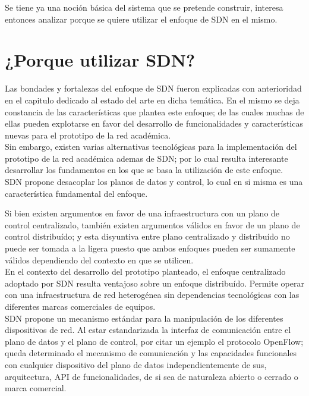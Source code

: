Se tiene ya una noción básica del sistema que se pretende construir, interesa entonces analizar porque se quiere utilizar el enfoque de SDN en el mismo.
  
\section[¿Porque utilizar SDN?]{¿Porque utilizar SDN?}

Las bondades y fortalezas del enfoque de SDN fueron explicadas con anterioridad en el capitulo dedicado al estado del arte en dicha tem\'atica. En el mismo se deja constancia de las caracter\'isticas que plantea este enfoque; de las cuales muchas de ellas pueden explotarse en favor del desarrollo de funcionalidades y caracter\'isticas nuevas para el prototipo de la red acad\'emica.\\

Sin embargo, existen varias alternativas tecnol\'ogicas para la implementaci\'on del prototipo de la red acad\'emica ademas de SDN; por lo cual resulta interesante desarrollar los fundamentos en los que se basa la utilizaci\'on de este enfoque.\\  

SDN propone desacoplar los planos de datos y control, lo cual en si misma es una caracter\'istica fundamental del enfoque.

Si bien existen argumentos en favor de una infraestructura con un plano de control centralizado, tambi\'en existen argumentos v\'alidos en favor de un plano de control distribu\'ido; y esta disyuntiva entre plano centralizado y distribu\'ido no puede ser tomada a la ligera puesto que ambos enfoques pueden ser sumamente v\'alidos dependiendo del contexto en que se utilicen.\\

En el contexto del desarrollo del prototipo planteado, el enfoque centralizado adoptado por SDN resulta ventajoso sobre un enfoque distribu\'ido. Permite operar con una infraestructura de red heterog\'enea sin dependencias tecnol\'ogicas con las diferentes marcas comerciales de equipos.\\

SDN propone un mecanismo estándar para la manipulaci\'on de los diferentes dispositivos de red. Al estar estandarizada la interfaz de comunicaci\'on entre el plano de datos y el plano de control, por citar un ejemplo el protocolo OpenFlow; queda determinado el mecanismo de comunicaci\'on y las capacidades funcionales con cualquier dispositivo del plano de datos independientemente de sus, arquitectura, API de funcionalidades, de si sea de naturaleza abierto o cerrado o marca comercial.\\ 

